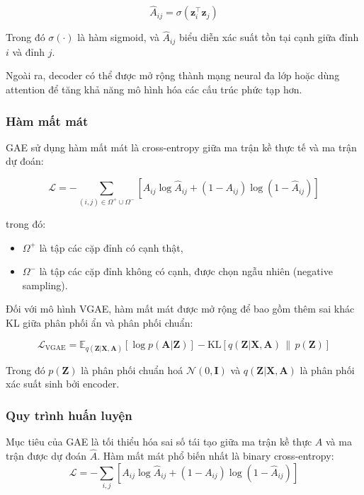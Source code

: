 \documentclass[a4paper]{article}
\begin{document}
\begin{equation}
\hat{A}_{ij} = \sigma(\mathbf{z}_i^\top \mathbf{z}_j)
\end{equation}

Trong đó $\sigma(\cdot)$ là hàm sigmoid, và $\hat{A}_{ij}$ biểu diễn xác suất tồn tại cạnh giữa đỉnh $i$ và đỉnh $j$.  

Ngoài ra, decoder có thể được mở rộng thành mạng neural đa lớp hoặc dùng attention để tăng khả năng mô hình hóa các cấu trúc phức tạp hơn.

\subsubsection{Hàm mất mát}

GAE sử dụng hàm mất mát là cross-entropy giữa ma trận kề thực tế và ma trận dự đoán:

\begin{equation}
\mathcal{L} = -\sum_{(i,j) \in \Omega^+ \cup \Omega^-} \left[ A_{ij} \log \hat{A}_{ij} + (1 - A_{ij}) \log (1 - \hat{A}_{ij}) \right]
\end{equation}

trong đó:
\begin{itemize}
  \item $\Omega^+$ là tập các cặp đỉnh có cạnh thật,
  \item $\Omega^-$ là tập các cặp đỉnh không có cạnh, được chọn ngẫu nhiên (negative sampling).
\end{itemize}

Đối với mô hình VGAE, hàm mất mát được mở rộng để bao gồm thêm sai khác KL giữa phân phối ẩn và phân phối chuẩn:

\begin{equation}
\mathcal{L}_{\text{VGAE}} = \mathbb{E}_{q(\mathbf{Z}|\mathbf{X}, \mathbf{A})}[\log p(\mathbf{A}|\mathbf{Z})] - \text{KL}[q(\mathbf{Z}|\mathbf{X}, \mathbf{A}) \,\|\, p(\mathbf{Z})]
\end{equation}

Trong đó $p(\mathbf{Z})$ là phân phối chuẩn hoá $\mathcal{N}(0, \mathbf{I})$ và $q(\mathbf{Z}|\mathbf{X}, \mathbf{A})$ là phân phối xác suất sinh bởi encoder.



\subsubsection{Quy trình huấn luyện}

Mục tiêu của GAE là tối thiểu hóa sai số tái tạo giữa ma trận kề thực $A$ và ma trận được dự đoán $\hat{A}$. Hàm mất mát phổ biến nhất là binary cross-entropy:
\begin{equation}
\mathcal{L} = - \sum_{i,j} [A_{ij} \log \hat{A}_{ij} + (1 - A_{ij}) \log (1 - \hat{A}_{ij})]
\end{equation}
\end{document}
